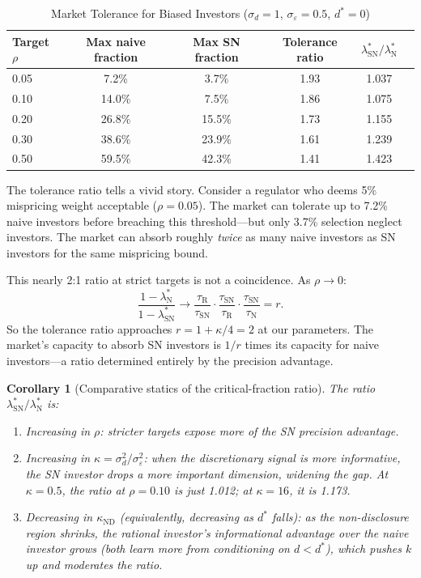 \documentclass[12pt]{article}
\theoremstyle{plain}
\newtheorem{corollary}[proposition]{Corollary}
\theoremstyle{definition}
\newcommand{\ND}{\mathrm{ND}}
\newcommand{\R}{\mathrm{R}}
\newcommand{\SN}{\mathrm{SN}}
\newcommand{\N}{\mathrm{N}}
\begin{document}
\begin{table}[h!]
\centering
\caption{Market Tolerance for Biased Investors ($\sigma_d = 1$, $\sigma_\varepsilon = 0.5$, $d^* = 0$)}
\label{tab:tolerance}
\begin{tabular}{lccccc}
\toprule
Target $\rho$ & Max naive fraction & Max SN fraction & Tolerance ratio & $\lambda^*_\SN/\lambda^*_\N$ \\
\midrule
0.05 & 7.2\% & 3.7\% & 1.93 & 1.037 \\
0.10 & 14.0\% & 7.5\% & 1.86 & 1.075 \\
0.20 & 26.8\% & 15.5\% & 1.73 & 1.155 \\
0.30 & 38.6\% & 23.9\% & 1.61 & 1.239 \\
0.50 & 59.5\% & 42.3\% & 1.41 & 1.423 \\
\bottomrule
\end{tabular}
\end{table}

The tolerance ratio tells a vivid story. Consider a regulator who deems 5\% mispricing weight acceptable ($\rho = 0.05$). The market can tolerate up to 7.2\% naive investors before breaching this threshold---but only 3.7\% selection neglect investors. The market can absorb roughly \emph{twice} as many naive investors as SN investors for the same mispricing bound.

This nearly 2:1 ratio at strict targets is not a coincidence. As $\rho \to 0$:
\[
\frac{1 - \lambda^*_\N}{1 - \lambda^*_\SN} \to \frac{\tau_\R}{\tau_\SN} \cdot \frac{\tau_\SN}{\tau_\R} \cdot \frac{\tau_\SN}{\tau_\N} = r.
\]
So the tolerance ratio approaches $r = 1 + \kappa/4 = 2$ at our parameters. The market's capacity to absorb SN investors is $1/r$ times its capacity for naive investors---a ratio determined entirely by the precision advantage.

\begin{corollary}[Comparative statics of the critical-fraction ratio]
\label{cor:lambda_ratio_cs}
The ratio $\lambda^*_\SN/\lambda^*_\N$ is:
\begin{enumerate}[nosep]
\item Increasing in $\rho$: stricter targets expose more of the SN precision advantage.
\item Increasing in $\kappa = \sigma_d^2/\sigma_\varepsilon^2$: when the discretionary signal is more informative, the SN investor drops a more important dimension, widening the gap. At $\kappa = 0.5$, the ratio at $\rho = 0.10$ is just 1.012; at $\kappa = 16$, it is 1.173.
\item Decreasing in $\kappa_{\ND}$ (equivalently, decreasing as $d^*$ falls): as the non-disclosure region shrinks, the rational investor's informational advantage over the naive investor grows (both learn more from conditioning on $d < d^*$), which pushes $k$ up and moderates the ratio.
\end{enumerate}
\end{corollary}
\end{document}
